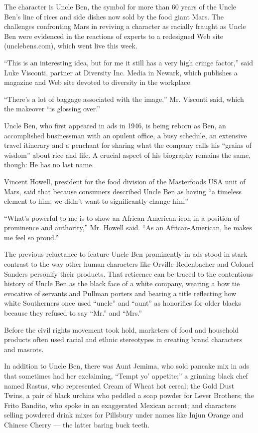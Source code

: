 The character is Uncle Ben, the symbol for more than 60 years of the
Uncle Ben's line of rices and side dishes now sold by the food giant
Mars. The challenges confronting Mars in reviving a character as
racially fraught as Uncle Ben were evidenced in the reactions of experts
to a redesigned Web site (unclebens.com), which went live this week.

``This is an interesting idea, but for me it still has a very high
cringe factor,'' said Luke Visconti, partner at Diversity Inc. Media in
Newark, which publishes a magazine and Web site devoted to diversity in
the workplace.

``There's a lot of baggage associated with the image,'' Mr. Visconti
said, which the makeover ``is glossing over.''

Uncle Ben, who first appeared in ads in 1946, is being reborn as Ben, an
accomplished businessman with an opulent office, a busy schedule, an
extensive travel itinerary and a penchant for sharing what the company
calls his ``grains of wisdom'' about rice and life. A crucial aspect of
his biography remains the same, though: He has no last name.

Vincent Howell, president for the food division of the Masterfoods USA
unit of Mars, said that because consumers described Uncle Ben as having
``a timeless element to him, we didn't want to significantly change
him.''

``What's powerful to me is to show an African-American icon in a
position of prominence and authority,'' Mr. Howell said. ``As an
African-American, he makes me feel so proud.''

The previous reluctance to feature Uncle Ben prominently in ads stood in
stark contrast to the way other human characters like Orville
Redenbacher and Colonel Sanders personify their products. That reticence
can be traced to the contentious history of Uncle Ben as the black face
of a white company, wearing a bow tie evocative of servants and Pullman
porters and bearing a title reflecting how white Southerners once used
``uncle'' and ``aunt'' as honorifics for older blacks because they
refused to say ``Mr.'' and ``Mrs.''

Before the civil rights movement took hold, marketers of food and
household products often used racial and ethnic stereotypes in creating
brand characters and mascots.

In addition to Uncle Ben, there was Aunt Jemima, who sold pancake mix in
ads that sometimes had her exclaiming, ``Tempt yo' appetite;'' a
grinning black chef named Rastus, who represented Cream of Wheat hot
cereal; the Gold Dust Twins, a pair of black urchins who peddled a soap
powder for Lever Brothers; the Frito Bandito, who spoke in an
exaggerated Mexican accent; and characters selling powdered drink mixes
for Pillsbury under names like Injun Orange and Chinese Cherry --- the
latter baring buck teeth.

